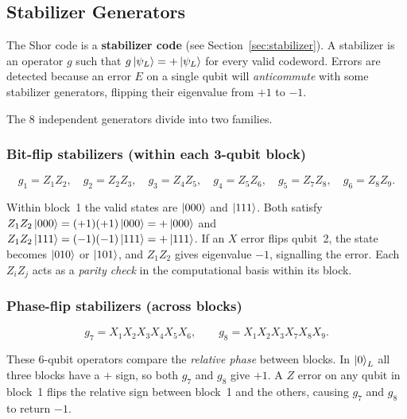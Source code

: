 \documentclass[11pt, a4paper]{article}
\theoremstyle{definition}
\theoremstyle{plain}
\theoremstyle{remark}
\begin{document}
\subsection{Stabilizer Generators}
\label{sec:shor-stabilizers}

The Shor code is a \textbf{stabilizer code} (see Section~\ref{sec:stabilizer}).
A stabilizer is an operator $g$ such that $g\ket{\psi_L} = +\ket{\psi_L}$
for every valid codeword.  Errors are detected because an error $E$ on a
single qubit will \emph{anticommute} with some stabilizer generators,
flipping their eigenvalue from $+1$ to $-1$.

The 8 independent generators divide into two families.

\subsubsection{Bit-flip stabilizers (within each 3-qubit block)}

\[
  g_1 = Z_1 Z_2,\quad g_2 = Z_2 Z_3,\quad
  g_3 = Z_4 Z_5,\quad g_4 = Z_5 Z_6,\quad
  g_5 = Z_7 Z_8,\quad g_6 = Z_8 Z_9.
\]

\begin{intuition}
Within block~1 the valid states are $\ket{000}$ and $\ket{111}$.  Both
satisfy $Z_1 Z_2\ket{000} = (+1)(+1)\ket{000} = +\ket{000}$ and
$Z_1 Z_2\ket{111} = (-1)(-1)\ket{111} = +\ket{111}$.
If an $X$ error flips qubit~2, the state becomes $\ket{010}$ or $\ket{101}$,
and $Z_1 Z_2$ gives eigenvalue $-1$, signalling the error.
Each $Z_i Z_j$ acts as a \emph{parity check} in the computational basis
within its block.
\end{intuition}

\subsubsection{Phase-flip stabilizers (across blocks)}

\[
  g_7 = X_1 X_2 X_3 X_4 X_5 X_6,\qquad
  g_8 = X_1 X_2 X_3 X_7 X_8 X_9.
\]

\begin{intuition}
These 6-qubit operators compare the \emph{relative phase} between blocks.
In $\ket{0}_L$ all three blocks have a $+$ sign, so both $g_7$ and $g_8$
give $+1$.  A $Z$ error on any qubit in block~1 flips the relative
sign between block~1 and the others, causing $g_7$ and $g_8$ to return
$-1$.
\end{intuition}
\end{document}

